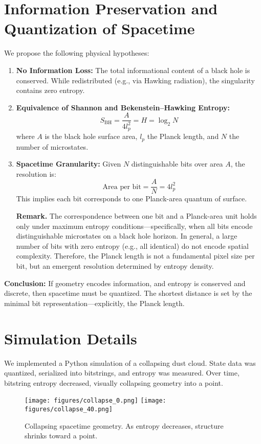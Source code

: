 \documentclass[11pt]{article}
\begin{document}
\section{Information Preservation and Quantization of Spacetime}

We propose the following physical hypotheses:
\begin{enumerate}
  \item \textbf{No Information Loss:} The total informational content of a black hole is conserved. While redistributed (e.g., via Hawking radiation), the singularity contains zero entropy.
  \item \textbf{Equivalence of Shannon and Bekenstein--Hawking Entropy:}
        \[
          S_{\text{BH}} = \frac{A}{4 l_p^2} = H = \log_2 N
        \]
        where $A$ is the black hole surface area, $l_p$ the Planck length, and $N$ the number of microstates.
  \item \textbf{Spacetime Granularity:} Given $N$ distinguishable bits over area $A$, the resolution is:
        \[
          \text{Area per bit} = \frac{A}{N} = 4 l_p^2
        \]
        This implies each bit corresponds to one Planck-area quantum of surface.

        \textbf{Remark.} The correspondence between one bit and a Planck-area unit holds only under maximum entropy conditions---specifically, when all bits encode distinguishable microstates on a black hole horizon. In general, a large number of bits with zero entropy (e.g., all identical) do not encode spatial complexity. Therefore, the Planck length is not a fundamental pixel size per bit, but an emergent resolution determined by entropy density.
\end{enumerate}

\textbf{Conclusion:} If geometry encodes information, and entropy is conserved and discrete, then spacetime must be quantized. The shortest distance is set by the minimal bit representation---explicitly, the Planck length.

\section{Simulation Details}

We implemented a Python simulation of a collapsing dust cloud. State data was quantized, serialized into bitstrings, and entropy was measured. Over time, bitstring entropy decreased, visually collapsing geometry into a point.

\begin{figure}[h!]
  \centering
  \texttt{[image: figures/collapse\_0.png]}
  \texttt{[image: figures/collapse\_40.png]}
  \caption{Collapsing spacetime geometry. As entropy decreases, structure shrinks toward a point.}
  \label{fig:vanishing_entropy}
\end{figure}
\end{document}
